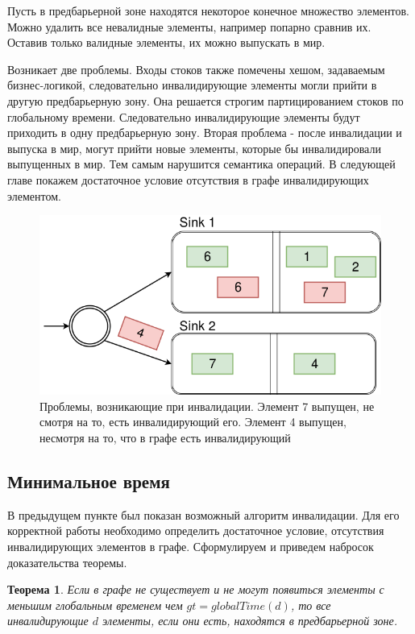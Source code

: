 \documentclass[14pt]{matmex-diploma-custom}
\newtheorem{theorem}{Теорема}
\begin{document}
Пусть в предбарьерной зоне находятся некоторое конечное множество элементов.  Можно удалить все невалидные элементы, например попарно сравнив их. Оставив только валидные элементы, их можно выпускать в мир.

Возникает две проблемы. Входы стоков также помечены хешом, задаваемым бизнес-логикой, следовательно инвалидирующие элементы могли прийти в другую предбарьерную зону. Она решается строгим партицированием стоков по глобальному времени. Следовательно инвалидирующие элементы будут приходить в одну предбарьерную зону. Вторая проблема - после инвалидации и выпуска в мир, могут прийти новые элементы, которые бы инвалидировали выпущенных в мир. Тем самым нарушится семантика операций. В следующей главе покажем достаточное условие отсутствия в графе инвалидирующих элементом.

\begin{figure}
  \centering
	\includegraphics[width=1.0\textwidth]{pics/invalid_problem.png}
	\caption{Проблемы, возникающие при инвалидации. Элемент 7 выпущен, не смотря на то, есть инвалидирующий его. Элемент 4 выпущен, несмотря на то, что в графе есть инвалидирующий}
\end{figure}

\subsection{Минимальное время}

В предыдущем пункте был показан возможный алгоритм инвалидации. Для его корректной работы необходимо определить достаточное условие, отсутствия инвалидирующих элементов в графе. Сформулируем и приведем набросок доказательства теоремы.

\begin{theorem}
Если в графе не существует и не могут появиться элементы с меньшим глобальным временем чем \(gt = globalTime(d)\), то все инвалидирующие \(d\) элементы, если они есть, находятся в предбарьерной зоне.
\end{theorem}
\end{document}
